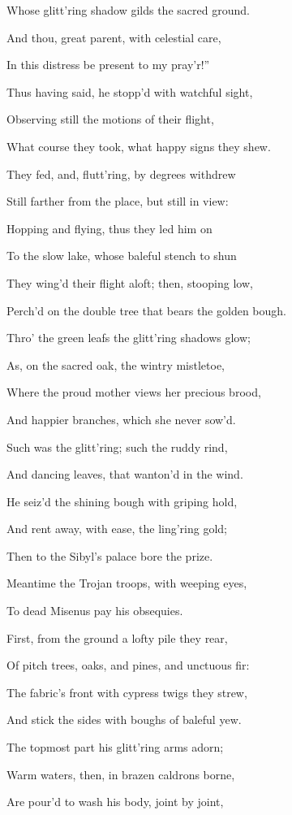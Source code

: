 Whose glitt’ring shadow gilds the sacred ground.

And thou, great parent, with celestial care,

In this distress be present to my pray’r!”

Thus having said, he stopp’d with watchful sight,

Observing still the motions of their flight,

What course they took, what happy signs they shew.

They fed, and, flutt’ring, by degrees withdrew

Still farther from the place, but still in view:

Hopping and flying, thus they led him on

To the slow lake, whose baleful stench to shun

They wing’d their flight aloft; then, stooping low,

Perch’d on the double tree that bears the golden bough.

Thro’ the green leafs the glitt’ring shadows glow;

As, on the sacred oak, the wintry mistletoe,

Where the proud mother views her precious brood,

And happier branches, which she never sow’d.

Such was the glitt’ring; such the ruddy rind,

And dancing leaves, that wanton’d in the wind.

He seiz’d the shining bough with griping hold,

And rent away, with ease, the ling’ring gold;

Then to the Sibyl’s palace bore the prize.

Meantime the Trojan troops, with weeping eyes,

To dead Misenus pay his obsequies.

First, from the ground a lofty pile they rear,

Of pitch trees, oaks, and pines, and unctuous fir:

The fabric’s front with cypress twigs they strew,

And stick the sides with boughs of baleful yew.

The topmost part his glitt’ring arms adorn;

Warm waters, then, in brazen caldrons borne,

Are pour’d to wash his body, joint by joint,

